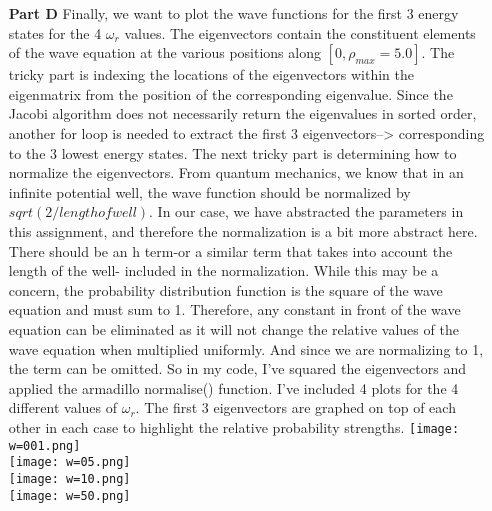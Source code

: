 \documentclass[11pt,a4wide]{article}
\begin{document}
\begin{enumerate}
\item[\bf Part D]
Finally, we want to plot the wave functions for the first 3 energy states for the 4 $\omega_r$ values. The eigenvectors contain the constituent elements of the wave equation at the various positions along $[0,\rho_{max}=5.0]$. The tricky part is indexing the locations of the eigenvectors within the eigenmatrix from the position of the corresponding eigenvalue. Since the Jacobi algorithm does not necessarily return the eigenvalues in sorted order, another for loop is needed to extract the first 3 eigenvectors--> corresponding to the 3 lowest energy states. \newline
The next tricky part is determining how to normalize the eigenvectors. From quantum mechanics, we know that in an infinite potential well, the wave function should be normalized by $sqrt(2/length of well)$. In our case, we have abstracted the parameters in this assignment, and therefore the normalization is a bit more abstract here. There should be an h term-or a similar term that takes into account the length of the well- included in the normalization. While this may be a concern, the probability distribution function is the square of the wave equation and must sum to 1. Therefore, any constant in front of the wave equation can be eliminated as it will not change the relative values of the wave equation when multiplied uniformly. And since we are normalizing to 1, the term can be omitted. So in my code, I've squared the eigenvectors and applied the armadillo normalise() function.  I've included 4 plots for the 4 different values of $\omega_r$. The first 3 eigenvectors are graphed on top of each other in each case to highlight the relative probability strengths. 
\texttt{[image: w=001.png]}\\
\texttt{[image: w=05.png]}\\
\texttt{[image: w=10.png]}\\
\texttt{[image: w=50.png]}\\

\end{enumerate}
\end{document}
